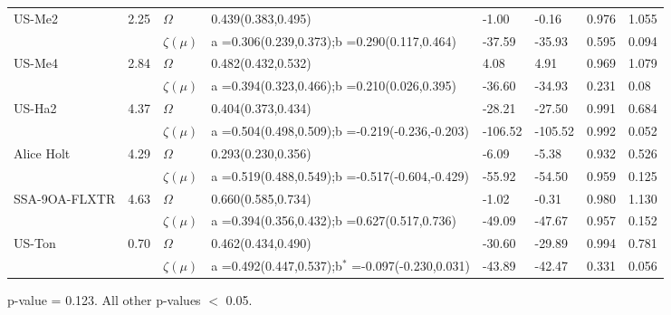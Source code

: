 \begin{sidewaystable}
\begin{tabular}{p{4.0cm} p{2.1cm} p{1.5cm} p{4.1cm} p{2.1cm} p{2.1cm} p{2.1cm} p{2.1cm}}
\multirow{2}{*}{US-Me2} 
    & 2.25  &  \bf $\Omega$         &  0.439(0.383,0.495) & -1.00 & -0.16 & 0.976 & 1.055\\
    &  &  \bf $\zeta(\mu)$         &  a =0.306(0.239,0.373);\newline b =0.290(0.117,0.464) & -37.59	& -35.93 & 0.595 & 0.094\\
\multirow{2}{*}{US-Me4} 
    & 2.84  &  \bf $\Omega$         &  0.482(0.432,0.532) & 4.08 & 4.91 & 0.969 & 1.079\\
    &  &  \bf $\zeta(\mu)$         &  a =0.394(0.323,0.466);\newline b =0.210(0.026,0.395) & -36.60 & -34.93 & 0.231 & 0.08
\\
\multirow{2}{*}{US-Ha2} 
    & 4.37  &  \bf $\Omega$        &   0.404(0.373,0.434) & -28.21 & -27.50 & 0.991 & 0.684\\
    &  &  \bf $\zeta(\mu)$          &  a =0.504(0.498,0.509);\newline b =-0.219(-0.236,-0.203) & -106.52 & -105.52 & 0.992 & 0.052\\
\hline
\multirow{1}{*}{Alice Holt} 
    & 4.29  &  \bf $\Omega$         &  0.293(0.230,0.356) & -6.09 & -5.38 & 0.932 & 0.526\\
    &  &  \bf $\zeta(\mu)$          &  a =0.519(0.488,0.549);\newline b =-0.517(-0.604,-0.429) & -55.92 & -54.50 & 0.959 & 0.125\\
\hline
\multirow{1}{*}{SSA-9OA-FLXTR} 
    & 4.63  &  \bf $\Omega$         &  0.660(0.585,0.734) & -1.02 & -0.31 & 0.980 & 1.130\\
    &  &  \bf $\zeta(\mu)$         &  a =0.394(0.356,0.432);\newline b =0.627(0.517,0.736) & -49.09	& -47.67 & 0.957 & 0.152\\
\hline
\multirow{1}{*}{US-Ton} 
    & 0.70  &  \bf $\Omega$         &  0.462(0.434,0.490) & -30.60 & -29.89 & 0.994 & 0.781\\
    &  &  \bf $\zeta(\mu)$         &  a =0.492(0.447,0.537);\newline b$^*$ =-0.097(-0.230,0.031)& -43.89	& -42.47 & 0.331 & 0.056\\
\hline
\hline
 \end{tabular}
\label{tab:sites_stats}
\begin{tablenotes}
      \small
      \item *p-value = 0.123. All other p-values $<$ 0.05.
\end{tablenotes}
\end{sidewaystable}
\newpage



